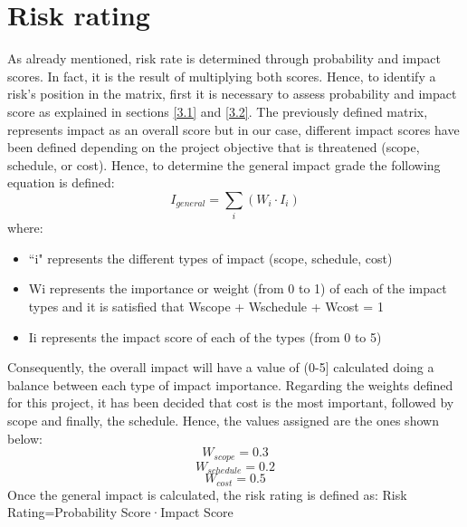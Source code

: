 \section{Risk rating}
As already mentioned, risk rate is determined through probability and impact scores. In fact, it is the result of multiplying both scores. Hence, to identify a risk’s position in the matrix, first it is necessary to assess probability and impact score as explained in sections \ref{3.1} and \ref{3.2}.
The previously defined matrix, represents impact as an overall score but in our case, different impact scores have been defined depending on the project objective that is threatened (scope, schedule, or cost). Hence, to determine the general impact grade the following equation is defined:
$$
I_{general}=\sum_{i}(W_i\cdot I_i)
$$
where:
\begin{itemize}
	\item “i" represents the different types of impact (scope, schedule, cost)
	\item Wi represents the importance or weight (from 0 to 1) of each of the impact types and it is satisfied that Wscope + Wschedule + Wcost = 1
	\item Ii represents the impact score of each of the types (from 0 to 5)
\end{itemize}


Consequently, the overall impact will have a value of (0-5] calculated doing a balance between each type of impact importance.
Regarding the weights defined for this project, it has been decided that cost is the most important, followed by scope and finally, the schedule. Hence, the values assigned are the ones shown  below:
	$$W_{scope}=0.3$$
	$$W_{schedule}=0.2$$
	$$W_{cost}=0.5$$
Once the general impact is calculated, the risk rating is defined as:
Risk Rating=Probability Score·Impact Score

